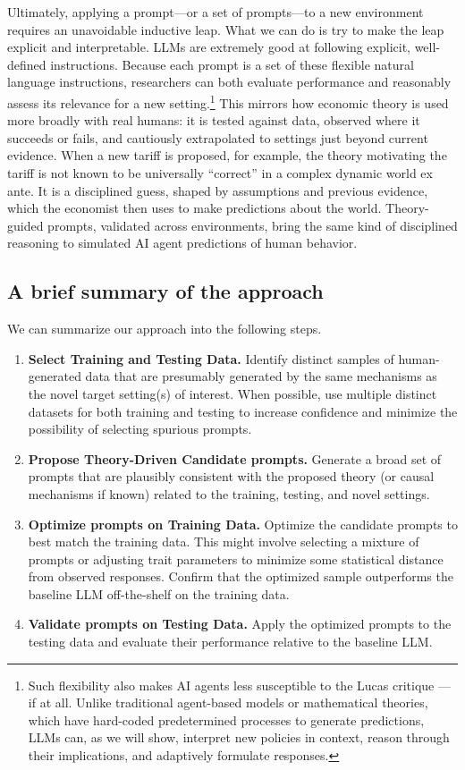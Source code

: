 \documentclass[11pt]{article}
\theoremstyle{definition}
\newcommand{\aisub}{AI agent}
\newcommand{\persona}{prompt}
\begin{document}
Ultimately, applying a \persona{}---or a set of \persona{s}---to a new environment requires an unavoidable inductive leap.
What we can do is try to make the leap explicit and interpretable.  
LLMs are extremely good at following explicit, well-defined instructions.
Because each \persona{} is a set of these flexible natural language instructions, researchers can both evaluate performance and reasonably assess its relevance for a new setting.\footnote{Such flexibility also makes \aisub{s} less susceptible to the Lucas critique \citep{Lucas1976Critique}---if at all.
Unlike traditional agent-based models or mathematical theories, which have hard-coded predetermined processes to generate predictions, LLMs can, as we will show, interpret new policies in context, reason through their implications, and adaptively formulate responses.
}
This mirrors how economic theory is used more broadly with real humans: it is tested against data, observed where it succeeds or fails, and cautiously extrapolated to settings just beyond current evidence.
When a new tariff is proposed, for example, the theory motivating the tariff is not known to be universally ``correct'' in a complex dynamic world ex ante.
It is a disciplined guess, shaped by assumptions and previous evidence, which the economist then uses to make predictions about the world.
Theory-guided \persona{s}, validated across environments, bring the same kind of disciplined reasoning to simulated \aisub{} predictions of human behavior.

\subsection{A brief summary of the approach}

We can summarize our approach into the following steps.

\begin{enumerate}[itemsep=1pt, topsep=0pt]
\item \textbf{Select Training and Testing Data.} Identify distinct samples of human-generated data that are presumably generated by the same mechanisms as the novel target setting(s) of interest. 
When possible, use multiple distinct datasets for both training and testing to increase confidence and minimize the possibility of selecting spurious \persona{s}.
\item \textbf{Propose Theory-Driven Candidate \persona{s}.} Generate a broad set of \persona{s} that are plausibly consistent with the proposed theory (or causal mechanisms if known) related to the training, testing, and novel settings.
\item \textbf{Optimize \persona{s} on Training Data.} Optimize the candidate \persona{s} to best match the training data. 
This might involve selecting a mixture of \persona{s} or adjusting trait parameters to minimize some statistical distance from observed responses.
Confirm that the optimized sample outperforms the baseline LLM off-the-shelf on the training data.
\item \textbf{Validate \persona{s} on Testing Data.} Apply the optimized \persona{s} to the testing data and evaluate their performance relative to the baseline LLM.
\end{enumerate}
\end{document}
